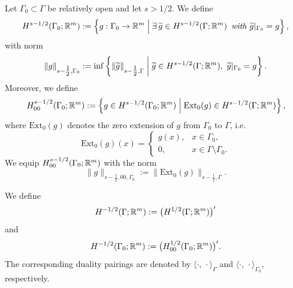 \begin{definition}
	Let $\Gamma_0\subset\Gamma$ be relatively open and let $s>1/2$. We define
	\begin{equation*}
		H^{s-1/2}(\Gamma_0;{\mathbb R}^m)
		:=
		\left\{g:\Gamma_0\to {\mathbb R}^m\;\middle|\;\exists\,\widetilde g\in H^{s-1/2}(\Gamma;{\mathbb R}^m)\text{\em\enspace with }\widetilde g|_{\Gamma_0}=g\right\},
	\end{equation*}
	with norm
	\begin{equation*}
		\|g\|_{s-\tfrac12,\Gamma_0}
		:=
		\inf\left\{
		\|\widetilde g\|_{s-\tfrac12,\Gamma}
		\;\middle|\;
		\widetilde g\in H^{s-1/2}(\Gamma;{\mathbb R}^m),\ \widetilde g|_{\Gamma_0}=g
		\right\}.
	\end{equation*}
	Moreover, we define
	\begin{equation*}
		H^{s-1/2}_{00}(\Gamma_0;{\mathbb R}^m)
		:=
		\left\{g\in H^{s-1/2}(\Gamma_0;{\mathbb R}^m)\;\middle|\;\mathrm{Ext}_0(g)\in H^{s-1/2}(\Gamma;{\mathbb R}^m)\right\},
	\end{equation*}
	where $\mathrm{Ext}_0(g)$ denotes the zero extension of $g$ from $\Gamma_0$ to $\Gamma$, i.e.
	\begin{equation*}
		\mathrm{Ext}_0 (g)(x)
		=
		\begin{cases}
			g(x), & x\in\Gamma_0,                \\
			0,    & x\in\Gamma\setminus\Gamma_0.
		\end{cases}
	\end{equation*}
	We equip $H^{s-1/2}_{00}(\Gamma_0;{\mathbb R}^m)$ with the norm
	\begin{equation*}
		\|g\|_{s-\tfrac12,00,\Gamma_0}:=\|\mathrm{Ext}_0(g)\|_{s-\tfrac12,\Gamma}.
	\end{equation*}
\end{definition}

\begin{definition}\label{def:dual_trace_spaces}
	We define
	\begin{equation*}
		H^{-1/2}(\Gamma;{\mathbb R}^m):=\big(H^{1/2}(\Gamma;{\mathbb R}^m)\big)^\prime
	\end{equation*}
	and
	\begin{equation*}
		H^{-1/2}(\Gamma_0;{\mathbb R}^m):=\big(H^{1/2}_{00}(\Gamma_0;{\mathbb R}^m)\big)^\prime.
	\end{equation*}
	The corresponding duality pairings are denoted by $\langle\cdot,\,\cdot\rangle_\Gamma$ and $\langle\cdot,\,\cdot\rangle_{\Gamma_0}$, respectively.
\end{definition}

